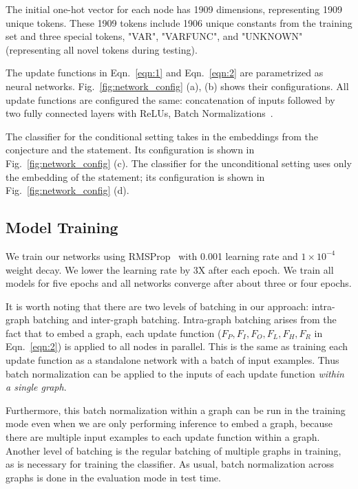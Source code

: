 \documentclass{article}
\begin{document}
\label{sec:network_config}
The initial one-hot vector for each node has 1909 dimensions, representing
   1909 unique tokens. These 1909 tokens include 1906 unique
  constants from the training set and three special tokens, "VAR", "VARFUNC", and
  "UNKNOWN" (representing all novel tokens during testing). 

The update functions in Eqn.~\ref{eqn:1} and Eqn.~\ref{eqn:2} are parametrized as neural
networks. Fig.~\ref{fig:network_config} (a), (b) shows their configurations. All update functions are
configured the same: concatenation of inputs followed by two fully connected layers with
ReLUs, Batch Normalizations~\cite{ioffe2015batch}.  

The classifier for the conditional setting takes in the embeddings from the conjecture
and the statement. Its configuration is shown in Fig.~\ref{fig:network_config} (c). The classifier for
the unconditional setting uses only the embedding of the statement; its configuration is
shown in Fig.~\ref{fig:network_config} (d). 

\subsection{Model Training}

We train our networks using RMSProp~\cite{hinton2012lecture} with 0.001 learning rate and
$1\times 10^{-4}$ weight decay. We lower the learning rate by 3X after each epoch. We train all
models for five epochs and all networks converge after about three or four epochs. 

It is worth noting that there are two levels of batching in our approach: intra-graph
batching and inter-graph batching. Intra-graph batching arises from the fact that to embed
a graph, each update function ($F_P, F_I,F_O, F_L, F_H, F_R$ in Eqn.~\ref{eqn:2}) is applied to all nodes in
parallel. This is the same as training each update function as a standalone network with a
batch of input examples. Thus batch normalization can be applied to the
inputs of each update function \emph{within a single graph}. 

Furthermore, this batch
normalization within a graph can be run in the training mode even when we are
only performing inference to embed a graph, because there are multiple input examples to each update function within a
graph. Another level of batching is the regular batching of multiple graphs in training,
as is necessary for training the classifier. As usual, batch normalization across graphs is done in
 the evaluation mode in test time. 
\end{document}

